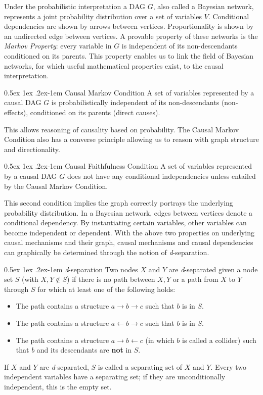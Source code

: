 \documentclass[a4paper, 10pt, english, onecolumn]{article}
\makeatletter
\renewcommand{\paragraph}{%
  \@startsection{paragraph}{4}%
  {\z@}{0.5ex \@plus 1ex \@minus .2ex}{-1em}%
  {\normalfont\normalsize\bfseries}%
}
\makeatother
\begin{document}
Under the probabilistic interpretation a DAG $G$, also called a Bayesian network, represents a joint probability distribution over a set of variables $V$.
Conditional dependencies are shown by arrows between vertices.
Proportionality is shown by an undirected edge between vertices.
A provable property of these networks is the \textit{Markov Property}: every variable in $G$ is independent of its non-descendants conditioned on its parents.
This property enables us to link the field of Bayesian networks, for which useful mathematical properties exist, to the causal interpretation.

\paragraph{Causal Markov Condition}
A set of variables represented by a causal DAG $G$ is probabilistically independent of its non-descendants (non-effects), conditioned on its parents (direct causes).

This allows reasoning of causality based on probability.
The Causal Markov Condition also has a converse principle allowing us to reason with graph structure and directionality.

\paragraph{Causal Faithfulness Condition}
A set of variables represented by a causal DAG $G$ does not have any conditional independencies unless entailed by the Causal Markov Condition.

This second condition implies the graph correctly portrays the underlying probability distribution.
In a Bayesian network, edges between vertices denote a conditional dependency.
By instantiating certain variables, other variables can become independent or dependent.
With the above two properties on underlying causal mechanisms and their graph, causal mechanisms and causal dependencies can graphically be determined through the notion of \textit{d}-separation.

\paragraph{\textit{d}-separation}
Two nodes $X$ and $Y$ are \textit{d}-separated given a node set $S$ (with $X, Y \notin S$) if there is no path between $X,Y$ or a path from $X$ to $Y$ through $S$ for which at least one of the following holds:
\begin{itemize}
\item The path contains a structure $a \rightarrow b \rightarrow c$ such that $b$ is in $S$.
\item The path contains a structure $a \leftarrow b \rightarrow c$ such that $b$ is in $S$.
\item The path contains a structure $a \rightarrow b \leftarrow c$ (in which $b$ is called a collider) such that $b$ and its descendants are \textbf{not} in $S$.
\end{itemize}
If $X$ and $Y$ are \textit{d}-separated, $S$ is called a separating set of $X$ and $Y$.
Every two independent variables have a separating set; if they are unconditionally independent, this is the empty set.
\end{document}
